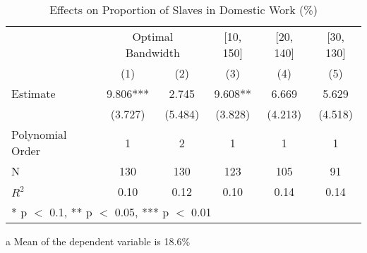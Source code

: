 \begin{table}[!h]

\caption{Effects on Proportion of Slaves in Domestic Work (\%) \label{tab:rdd_enslaved_domestic}}
\centering
\begin{threeparttable}
\begin{tabular}[t]{lccccc}
\toprule
\multicolumn{1}{c}{} & \multicolumn{2}{c}{Optimal Bandwidth} & \multicolumn{1}{c}{[10, 150]} & \multicolumn{1}{c}{[20, 140]} & \multicolumn{1}{c}{[30, 130]} \\
\cmidrule(l{3pt}r{3pt}){2-3} \cmidrule(l{3pt}r{3pt}){4-4} \cmidrule(l{3pt}r{3pt}){5-5} \cmidrule(l{3pt}r{3pt}){6-6}
  & (1) & (2) & (3) & (4) & (5)\\
\midrule
Estimate & \num{9.806}*** & \num{2.745} & \num{9.608}** & \num{6.669} & \num{5.629}\\
 & (\num{3.727}) & (\num{5.484}) & (\num{3.828}) & (\num{4.213}) & (\num{4.518})\\

\midrule
Polynomial Order & 1 & 2 & 1 & 1 & 1\\
N & \num{130} & \num{130} & \num{123} & \num{105} & \num{91}\\
$R^2$ & \num{0.10} & \num{0.12} & \num{0.10} & \num{0.14} & \num{0.14}\\
\bottomrule
\multicolumn{6}{l}{\rule{0pt}{1em}* p $<$ 0.1, ** p $<$ 0.05, *** p $<$ 0.01}\\
\end{tabular}
\begin{tablenotes}
\item[a] Mean of the dependent variable is 18.6\%
\end{tablenotes}
\end{threeparttable}
\end{table}
